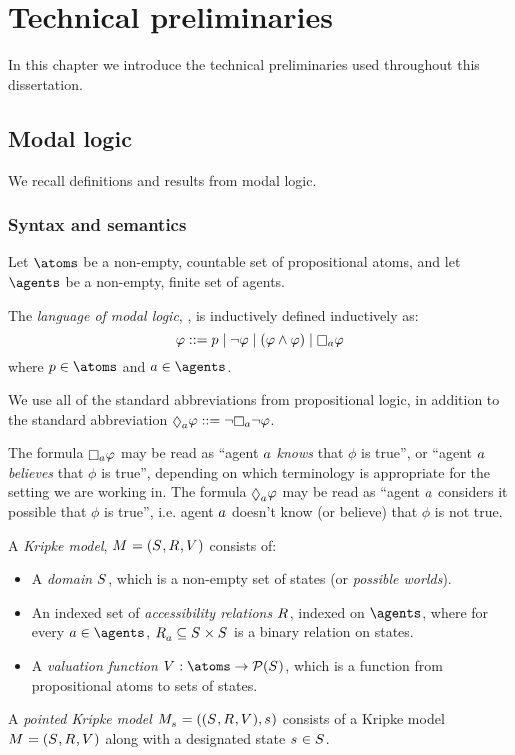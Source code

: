 \chapter{Technical preliminaries}

In this chapter we introduce the technical preliminaries used throughout this dissertation.

\section{Modal logic}

We recall definitions and results from modal logic.

\subsection{Syntax and semantics}

Let $\atoms$ be a non-empty, countable set of propositional atoms, and
let $\agents$ be a non-empty, finite set of agents.

\begin{definition}
The {\em language of modal logic}, \langMl{}, is inductively defined inductively as:
$$
\phi ::= 
    \atomP \mid
    \lnot \phi \mid
    (\phi \land \phi) \mid
    \necessary[\agentA] \phi
$$
where $\atomP \in \atoms$ and $\agentA \in \agents$.
\end{definition}

We use all of the standard abbreviations from propositional logic, in addition to the standard abbreviation $\possible[\agentA] \phi ::= \lnot \necessary[\agentA] \lnot \phi$.

The formula $\necessary[\agentA] \phi$ may be read as ``agent $a$ {\em knows} that $\phi$ is true'', or ``agent $a$ {\em believes} that $\phi$ is true'', depending on which terminology is appropriate for the setting we are working in.
The formula $\possible[\agentA] \phi$ may be read as ``agent $a$ considers it possible that $\phi$ is true'', i.e. agent $a$ doesn't know (or believe) that $\phi$ is not true.

\begin{definition}
A {\em Kripke model}, $\modelAndTuple$ consists of:
\begin{itemize}
    \item A {\em domain} $\states$, which is a non-empty set of states (or {\em possible worlds}).
    \item An indexed set of {\em accessibility relations} $\accessibilityRel$, indexed on $\agents$, where for every $\agentA \in \agents$, $\accessibility{\agentA} \subseteq \states \times \states$ is a binary relation on states.
    \item A {\em valuation function} $\valuation : \atoms \to \powerset(\states)$, which is a function from propositional atoms to sets of states.
\end{itemize}
A {\em pointed Kripke model} $\pointedModelAndTuple{\stateS}$ consists of a Kripke model $\modelAndTuple$ along with a designated state $\stateS \in \states$.
\end{definition}

